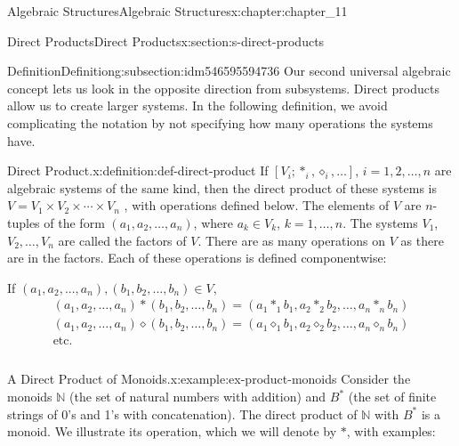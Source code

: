 \documentclass[oneside,10pt,]{book}
\numberwithin{equation}{section}
\begin{document}
\begin{chapterptx}{Algebraic Structures}{}{Algebraic Structures}{}{}{x:chapter:chapter_11}
\begin{sectionptx}{Direct Products}{}{Direct Products}{}{}{x:section:s-direct-products}
%
%
%
\typeout{************************************************}
\typeout{************************************************}
%
\begin{subsectionptx}{Definition}{}{Definition}{}{}{g:subsection:idm546595594736}
Our second universal algebraic concept lets us look in the opposite direction from subsystems. Direct products allow us to create larger systems. In the following definition, we avoid complicating the notation by not specifying how many operations the systems have.%
\begin{definition}{Direct Product.}{x:definition:def-direct-product}%
%
\label{g:notation:idm546595593440}%
If \(\left[V_i;*_i, \diamond_i, \ldots \right]\), \(i = 1, 2, \ldots, n\) are algebraic systems of the same kind,  then the direct product of these systems is \(V =V_1\times
V_2\times \cdots \times V_n\) , with operations defined below. The elements of \(V\) are \(n\)-tuples of the form \(\left(a_1, a_2, \dots , a _n \right)\), where \(a_k \in  V_k\), \(k = 1, \dots , n\). The systems \(V_1\), \(V_2,  \dots, V_n\) are called the factors of \(V\). There are as many operations on \(V\) as there are in the factors.  Each of these operations is defined componentwise:%
\par
If \(\left(a_1, a_2, . . . , a _n \right), \left(b_1,b_2, . . . , b _n \right)\in V\),%
\begin{equation*}
\begin{array}{c}
\left(a_1, a_2, \dots , a_n \right) * \left(b_1, b_2, \dots , b_n \right) = \left(a_1 *_1 b_1, a_2 *_2 b_2,\ldots , a_n *_n b_n \right)\\
\left(a_1, a_2, \dots , a_n \right) \diamond  \left(b_1, b_2, \dots , b_n \right) = \left(a_1 \diamond_1 b_1, a_2 \diamond_2 b_2,\dots , a_n \diamond_n b_n\right)\\
\textrm{etc.}\\
\\
\end{array}
\end{equation*}
%
\end{definition}
\begin{example}{A Direct Product of Monoids.}{x:example:ex-product-monoids}%
Consider the monoids \(\mathbb{N}\) (the set of natural numbers with addition) and \(B^*\) (the set of finite strings of 0's and 1's with concatenation). The direct product of \(\mathbb{N}\) with \(B^*\) is a monoid. We illustrate its operation, which we will denote by \(*\), with examples:%

\end{example}
\end{subsectionptx}
\end{sectionptx}
\end{chapterptx}
\end{document}
